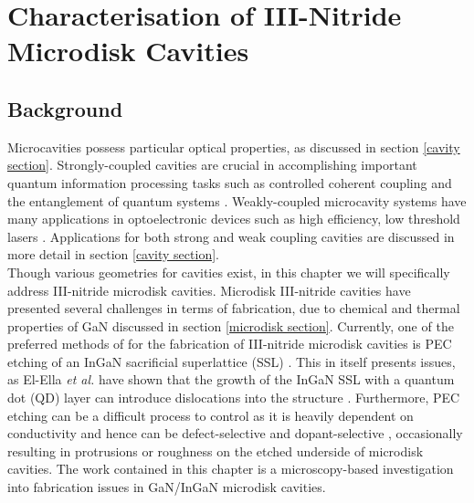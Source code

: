 
\chapter{Characterisation of III-Nitride Microdisk Cavities}

\ifpdf
    \graphicspath{{Chapter2/Figs/Raster/}{Chapter2/Figs/PDF/}{Chapter2/Figs/}}
\else
    \graphicspath{{Chapter2/Figs/Vector/}{Chapter2/Figs/}}
\fi


\section[Background]{Background}

Microcavities possess particular optical properties, as discussed in section \ref{cavity section}. Strongly-coupled cavities are crucial in accomplishing important quantum information processing tasks such as controlled coherent coupling and the entanglement of quantum systems \cite{Hennessy2007}. Weakly-coupled microcavity systems have many applications in optoelectronic devices such as high efficiency, low threshold lasers \cite{Vahala2003}. Applications for both strong and weak coupling cavities are discussed in more detail in section \ref{cavity section}.
\\ Though various geometries for cavities exist, in this chapter we will specifically address III-nitride microdisk cavities. Microdisk III-nitride cavities have presented several challenges in terms of fabrication, due to chemical and thermal properties of GaN discussed in section \ref{microdisk section}. Currently, one of the preferred methods of for the fabrication of III-nitride microdisk cavities is PEC etching of an InGaN sacrificial superlattice  (SSL) \cite{Puchtler2015}. This in itself presents issues, as El-Ella \textit{et al.} have shown that the growth of the InGaN SSL with a quantum dot (QD) layer can introduce dislocations into the structure \cite{El-Ella2011a}. Furthermore, PEC etching can be a difficult process to control as it is heavily dependent on conductivity and hence can be defect-selective \cite{Visconti2001,Youtsey1999,Youtsey1998} and dopant-selective \cite{Youtsey1999}, occasionally resulting in protrusions or roughness \cite{Puchtler2015} on the etched underside of microdisk cavities. The work contained in this chapter is a microscopy-based investigation into fabrication issues in GaN/InGaN microdisk cavities.

